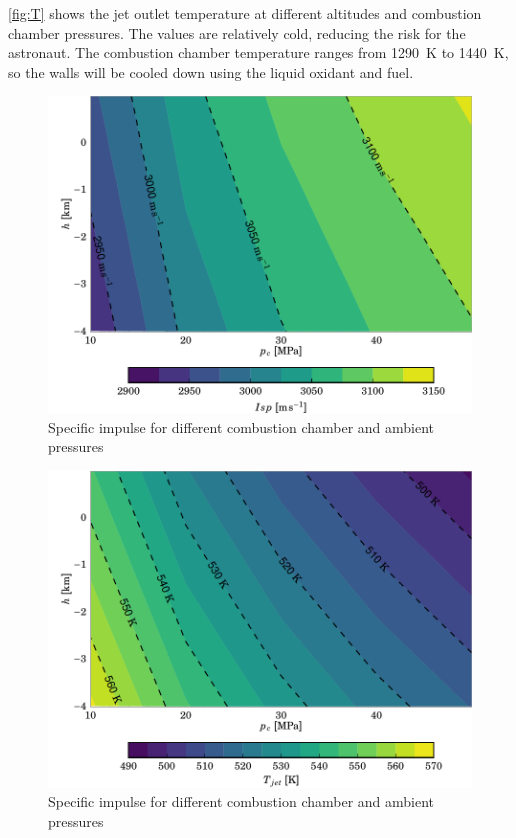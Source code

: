 \documentclass[twocolumn]{article}
\begin{document}
\autoref{fig:T} shows the jet outlet temperature at different altitudes and 
combustion chamber pressures. The values are relatively cold, reducing the risk 
for the astronaut. The combustion chamber temperature ranges from 
\SI{1290}{\kelvin} to \SI{1440}{\kelvin}, so the walls will be cooled down 
using the liquid oxidant and fuel.

\begin{figure}
  \centering
  \includegraphics{img/isp}
  \caption{Specific impulse for different combustion chamber and ambient 
pressures}
  \label{fig:isp}
\end{figure}

\begin{figure}
  \centering
  \includegraphics{img/T}
  \caption{Specific impulse for different combustion chamber and ambient 
pressures}
  \label{fig:T}
\end{figure}
\end{document}

